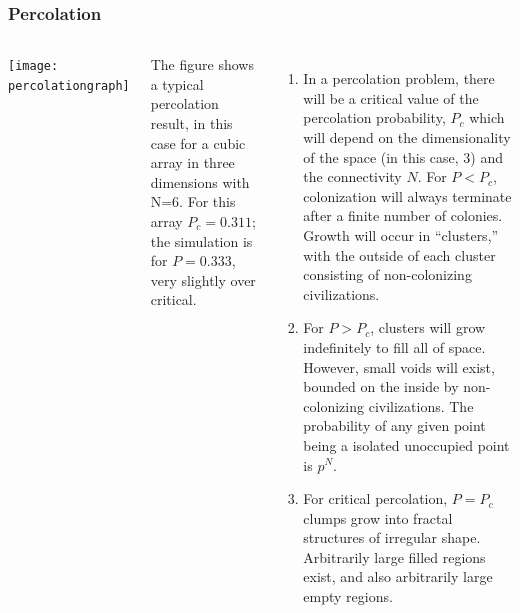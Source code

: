 \begin{frame}
\frametitle{Percolation}

\begin{columns}
 \texttt{[image: percolationgraph]}


The figure shows a typical percolation result, in this case for a cubic array in three dimensions with N=6. For this array $P_c=0.311$; the simulation is for $P =0.333$, very slightly over critical.

\begin{enumerate}
 
\item In a percolation problem, there will be a critical value of the percolation probability, $P_c$ which will depend on the dimensionality of the space (in this case, 3) and the connectivity $N$. For $P < P_c$, colonization will always terminate after a finite number of colonies. Growth will occur in
``clusters,'' with the outside of each cluster consisting of non-colonizing civilizations.  
\item  For $P > P_c$, clusters will grow indefinitely to fill all of space. However, small voids will exist, bounded on the inside by non-colonizing civilizations. The probability of any given point being a isolated unoccupied point is $p^N$. 
\item For critical percolation, $P=P_c$ clumps grow into fractal structures of irregular shape. Arbitrarily large filled regions exist, and also arbitrarily large empty regions. 
\end{enumerate}
 \end{columns}
\end{frame}

